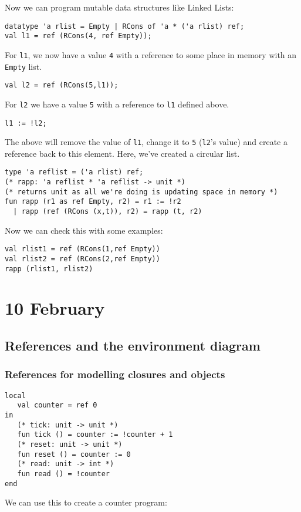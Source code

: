 \documentclass[11pt]{article}
\begin{document}
Now we can program mutable data structures like Linked Lists:
\begin{verbatim}
datatype 'a rlist = Empty | RCons of 'a * ('a rlist) ref;
val l1 = ref (RCons(4, ref Empty));
\end{verbatim}
For \verb~l1~, we now have a value \verb~4~ with a reference to some place in memory with an \verb~Empty~ list.
\begin{verbatim}
val l2 = ref (RCons(5,l1));
\end{verbatim}
For \verb~l2~ we have a value \verb~5~ with a reference to \verb~l1~ defined above.
\begin{verbatim}
l1 := !l2;
\end{verbatim}
The above will remove the value of \verb~l1~, change it to \verb~5~ (\verb~l2~'s value) and create a reference back to this element. Here, we've created a circular list.
\begin{verbatim}
type 'a reflist = ('a rlist) ref;
(* rapp: 'a reflist * 'a reflist -> unit *)
(* returns unit as all we're doing is updating space in memory *)
fun rapp (r1 as ref Empty, r2) = r1 := !r2
  | rapp (ref (RCons (x,t)), r2) = rapp (t, r2)
\end{verbatim}
Now we can check this with some examples:
\begin{verbatim}
val rlist1 = ref (RCons(1,ref Empty))
val rlist2 = ref (RCons(2,ref Empty))
rapp (rlist1, rlist2)
\end{verbatim}


\section{10 February}
\subsection{References and the environment diagram}
\subsubsection{References for modelling closures and objects}
\begin{verbatim}
local
   val counter = ref 0
in
   (* tick: unit -> unit *)
   fun tick () = counter := !counter + 1
   (* reset: unit -> unit *)
   fun reset () = counter := 0
   (* read: unit -> int *)
   fun read () = !counter
end
\end{verbatim}

We can use this to create a counter program:
\end{document}
